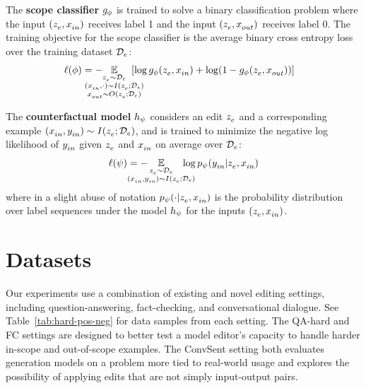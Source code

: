 \documentclass{article}
\begin{document}
The \textbf{scope classifier} $g_\phi$ is trained to solve a binary classification problem where the input $(z_e^{}, x_{in}^{})$ receives label 1 and the input $(z_e^{}, x_{out}^{})$ receives label 0. The training objective for the scope classifier is the average binary cross entropy loss over the training dataset $\mathcal{D}_{e}$:
\begin{equation}
\hspace{-3mm}\ell(\phi) = - \hspace{-7mm} \E_{\substack{\ze \sim \editdata\\
(\xtest, \cdot) \sim I(\ze; \editdata)\\ 
\xloc \sim O(\ze; \editdata)}}
\hspace{-5mm} \left[
\log \cls(\ze, \xtest) + \log (1-\cls(\ze, \xloc))
\right]
\end{equation}

The \textbf{counterfactual model} $h_\psi$ considers an edit $z_e^{}$ and a corresponding example $(x_{in}^{}, y_{in}^{})\sim I(z_e^{}; \mathcal{D}_{e})$, and is trained to minimize the negative log likelihood of $y_{in}^{}$ given $z_e^{}$ and $x_{in}^{}$ on average over $\mathcal{D}_{e}$:
\begin{equation}
\ell(\psi) = - \hspace{-8mm} \E_{\substack{\ze \sim \editdata\\
(\xtest, \ytest) \sim I(\ze; \editdata)}} \hspace{-5mm} \log p_\psi(\ytest | \ze, \xtest)
\end{equation}
where in a slight abuse of notation $p_\psi(\cdot | z_e^{}, x_{in}^{})$ is the probability distribution over label sequences under the model $h_\psi$ for the inputs $(z_e^{}, x_{in}^{})$.



\section{Datasets}

Our experiments use a combination of existing and novel editing settings, including question-answering, fact-checking, and conversational dialogue. See Table~\ref{tab:hard-pos-neg} for data samples from each setting. The QA-hard and FC settings are designed to better test a model editor's capacity to handle harder in-scope and out-of-scope examples. The ConvSent setting both evaluates generation models on a problem more tied to real-world usage and explores the possibility of applying edits that are not simply input-output pairs.
\end{document}
